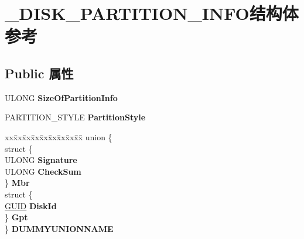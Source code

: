 \hypertarget{struct___d_i_s_k___p_a_r_t_i_t_i_o_n___i_n_f_o}{}\section{\+\_\+\+D\+I\+S\+K\+\_\+\+P\+A\+R\+T\+I\+T\+I\+O\+N\+\_\+\+I\+N\+F\+O结构体 参考}
\label{struct___d_i_s_k___p_a_r_t_i_t_i_o_n___i_n_f_o}
\subsection*{Public 属性}
\begin{DoxyCompactItemize}
\item 
\mbox{\label{struct___d_i_s_k___p_a_r_t_i_t_i_o_n___i_n_f_o_a865a692325a4d047eb6b7822e71c9b52}} 
U\+L\+O\+NG {\bfseries Size\+Of\+Partition\+Info}
\item 
\mbox{\label{struct___d_i_s_k___p_a_r_t_i_t_i_o_n___i_n_f_o_a2c429eac21ea507d4224fe6a9bb7f7c1}} 
P\+A\+R\+T\+I\+T\+I\+O\+N\+\_\+\+S\+T\+Y\+LE {\bfseries Partition\+Style}
\item 
\mbox{\label{struct___d_i_s_k___p_a_r_t_i_t_i_o_n___i_n_f_o_a02ad40d897a081397396546ae6f661a0}} 
\begin{tabbing}
xx\=xx\=xx\=xx\=xx\=xx\=xx\=xx\=xx\=\kill
union \{\\
\>struct \{\\
\>\>ULONG {\bfseries Signature}\\
\>\>ULONG {\bfseries CheckSum}\\
\>\} {\bfseries Mbr}\\
\>struct \{\\
\>\>\hyperlink{interface_g_u_i_d}{GUID} {\bfseries DiskId}\\
\>\} {\bfseries Gpt}\\
\} {\bfseries DUMMYUNIONNAME}\\


\end{tabbing}
\end{DoxyCompactItemize}
